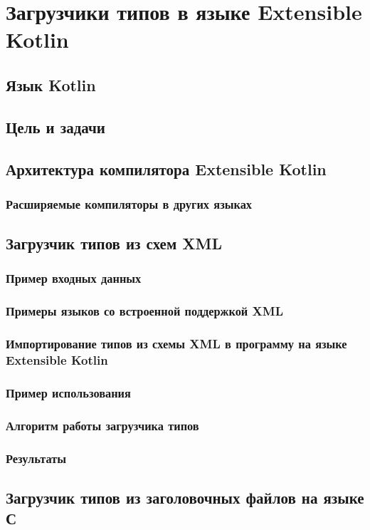 \section{Загрузчики типов в языке Extensible Kotlin}
\subsection{Язык Kotlin}
\subsection{Цель и задачи}
\subsection{Архитектура компилятора Extensible Kotlin}
\subsubsection{Расширяемые компиляторы в других языках}

\subsection{Загрузчик типов из схем XML}
\subsubsection{Пример входных данных}
\subsubsection{Примеры языков со встроенной поддержкой XML}
\subsubsection{Импортирование типов из схемы XML в программу на языке Extensible Kotlin}
\subsubsection{Пример использования}
\subsubsection{Алгоритм работы загрузчика типов}
\subsubsection{Результаты}

\subsection{Загрузчик типов из заголовочных файлов на языке С}
